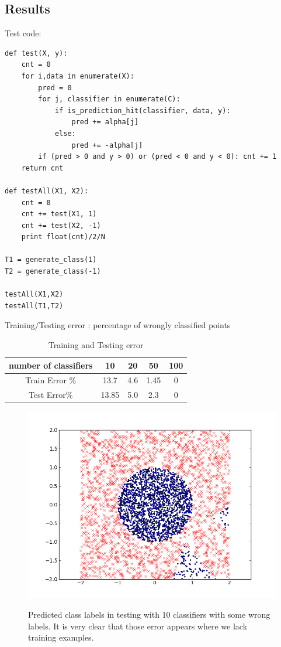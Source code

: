 \documentclass[]{article}  %
\begin{document}
\subsection{Results}

Test code:

\begin{verbatim}
def test(X, y):
    cnt = 0
    for i,data in enumerate(X):
        pred = 0
        for j, classifier in enumerate(C):
            if is_prediction_hit(classifier, data, y):
                pred += alpha[j]
            else:
                pred += -alpha[j]
        if (pred > 0 and y > 0) or (pred < 0 and y < 0): cnt += 1
    return cnt
        
def testAll(X1, X2):
    cnt = 0
    cnt += test(X1, 1)
    cnt += test(X2, -1)
    print float(cnt)/2/N
    
T1 = generate_class(1)
T2 = generate_class(-1)

testAll(X1,X2)
testAll(T1,T2)
\end{verbatim}
Training/Testing error : percentage of wrongly classified points

\begin{table}[htdp]
\caption{Training and Testing error }
\begin{center}
\begin{tabular}{c|c|c|c|c}

number of classifiers & 10 & 20 & 50 & 100\\
\hline
Train Error \% & 13.7 & 4.6 & 1.45 & 0\\
Test Error\% & 13.85 & 5.0 & 2.3 & 0
\end{tabular}
\end{center}
\label{default}
\end{table}%

\begin{figure}[h]
\begin{center}
\includegraphics[scale=.6]{10c.png}\label{fig:axis}
\end{center}
\caption{Predicted class labels in testing with 10 classifiers with some wrong labels. It is very clear that those error appears where we lack training examples. }
\end{figure}%
\end{document}
